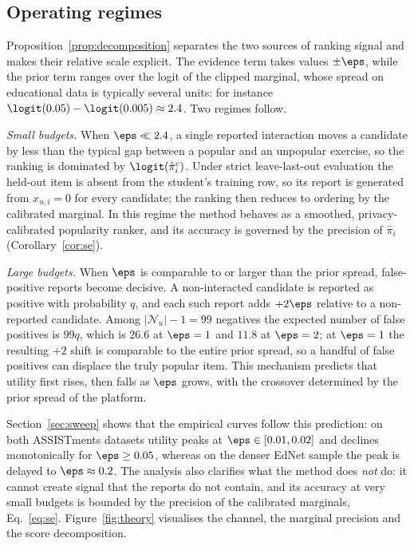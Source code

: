 \subsection{Operating regimes}\label{sec:regimes}

Proposition~\ref{prop:decomposition} separates the two sources of ranking signal and makes their relative scale explicit. The evidence term takes values $\pm\eps$, while the prior term ranges over the logit of the clipped marginal, whose spread on educational data is typically several units: for instance $\logit(0.05)-\logit(0.005)\approx2.4$. Two regimes follow.

\emph{Small budgets.} When $\eps\ll 2.4$, a single reported interaction moves a candidate by less than the typical gap between a popular and an unpopular exercise, so the ranking is dominated by $\logit(\hat\pi_i^{c})$. Under strict leave-last-out evaluation the held-out item is absent from the student's training row, so its report is generated from $x_{u,i}=0$ for every candidate; the ranking then reduces to ordering by the calibrated marginal. In this regime the method behaves as a smoothed, privacy-calibrated popularity ranker, and its accuracy is governed by the precision of $\hat\pi_i$ (Corollary~\ref{cor:se}).

\emph{Large budgets.} When $\eps$ is comparable to or larger than the prior spread, false-positive reports become decisive. A non-interacted candidate is reported as positive with probability $q$, and each such report adds $+2\eps$ relative to a non-reported candidate. Among $|\mathcal{N}_u|-1=99$ negatives the expected number of false positives is $99q$, which is $26.6$ at $\eps=1$ and $11.8$ at $\eps=2$; at $\eps=1$ the resulting $+2$ shift is comparable to the entire prior spread, so a handful of false positives can displace the truly popular item. This mechanism predicts that utility first rises, then falls as $\eps$ grows, with the crossover determined by the prior spread of the platform.

Section~\ref{sec:sweep} shows that the empirical curves follow this prediction: on both ASSISTments datasets utility peaks at $\eps\in[0.01,0.02]$ and declines monotonically for $\eps\ge0.05$, whereas on the denser EdNet sample the peak is delayed to $\eps\approx0.2$. The analysis also clarifies what the method does \emph{not} do: it cannot create signal that the reports do not contain, and its accuracy at very small budgets is bounded by the precision of the calibrated marginals, Eq.~\eqref{eq:se}. Figure~\ref{fig:theory} visualises the channel, the marginal precision and the score decomposition.

